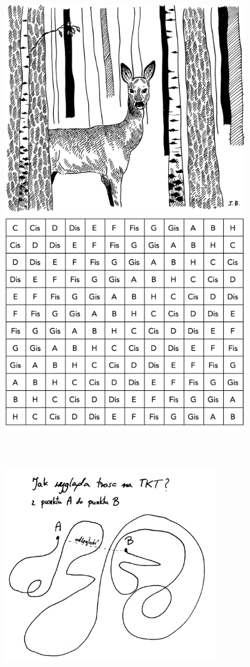\documentclass[a5paper, 10pt]{book}
\begin{document}
~\\~\\~\\
\includegraphics[width=0.8\textwidth, center]{zostanie_tyle_gor.png}\\

\newpage
\includegraphics[width=0.8\textwidth, center]{transposetab.png}\vspace*{-1cm}
~\\~\\~\\~\\
\includegraphics[width=0.7\textwidth, center]{trasa_na_tkt.png}\\
\end{document}
